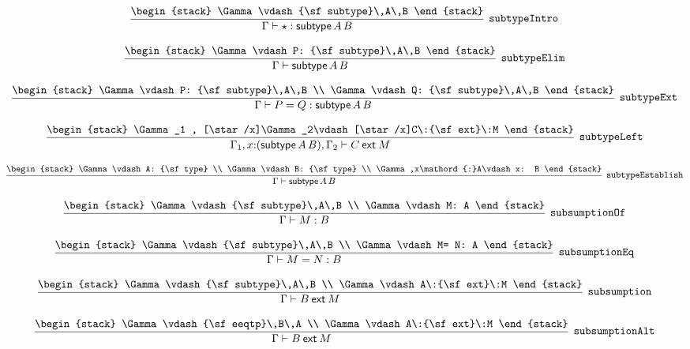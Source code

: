 \[
\infer[{\tt subtypeIntro}]{\Gamma \vdash \star : {\sf subtype}\,A\,B}{
\begin{stack}
\Gamma \vdash {\sf subtype}\,A\,B
\end{stack}}
\]

\[
\infer[{\tt subtypeElim}]{\Gamma \vdash {\sf subtype}\,A\,B}{
\begin{stack}
\Gamma \vdash P: {\sf subtype}\,A\,B
\end{stack}}
\]

\[
\infer[{\tt subtypeExt}]{\Gamma \vdash P= Q: {\sf subtype}\,A\,B}{
\begin{stack}
\Gamma \vdash P: {\sf subtype}\,A\,B
\\
\Gamma \vdash Q: {\sf subtype}\,A\,B
\end{stack}}
\]

\[
\infer[{\tt subtypeLeft}]{\Gamma_1 ,x\mathord{:}({\sf subtype}\,A\,B), \Gamma_2 \vdash C\:{\sf ext}\:M}{
\begin{stack}
\Gamma_1 , [\star /x]\Gamma_2\vdash [\star /x]C\:{\sf ext}\:M
\end{stack}}
\]

\[
\infer[{\tt subtypeEstablish}]{\Gamma \vdash {\sf subtype}\,A\,B}{
\begin{stack}
\Gamma \vdash A: {\sf type}
\\
\Gamma \vdash B: {\sf type}
\\
\Gamma ,x\mathord{:}A\vdash x: B
\end{stack}}
\]

\[
\infer[{\tt subsumptionOf}]{\Gamma \vdash M: B}{
\begin{stack}
\Gamma \vdash {\sf subtype}\,A\,B
\\
\Gamma \vdash M: A
\end{stack}}
\]

\[
\infer[{\tt subsumptionEq}]{\Gamma \vdash M= N: B}{
\begin{stack}
\Gamma \vdash {\sf subtype}\,A\,B
\\
\Gamma \vdash M= N: A
\end{stack}}
\]

\[
\infer[{\tt subsumption}]{\Gamma \vdash B\:{\sf ext}\:M}{
\begin{stack}
\Gamma \vdash {\sf subtype}\,A\,B
\\
\Gamma \vdash A\:{\sf ext}\:M
\end{stack}}
\]

\[
\infer[{\tt subsumptionAlt}]{\Gamma \vdash B\:{\sf ext}\:M}{
\begin{stack}
\Gamma \vdash {\sf eeqtp}\,B\,A
\\
\Gamma \vdash A\:{\sf ext}\:M
\end{stack}}
\]

